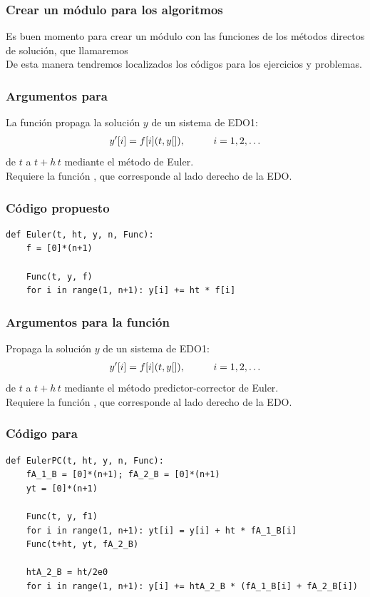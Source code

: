 \begin{frame}
\frametitle{Crear un módulo para los algoritmos}
Es buen momento para crear un módulo con las funciones de los métodos directos de solución, que llamaremos 
\\
\bigskip
De esta manera tendremos localizados los códigos para los ejercicios y problemas.
\end{frame}
\begin{frame}
\frametitle{Argumentos para }
La función propaga la solución $y$ de un sistema de EDO1:
\begin{align*}
{y}^{\prime}[i] =  f[i] (t, y[]), \hspace{1cm} i = 1, 2, \ldots
\end{align*}
de $t$ a $t + h \, t$ mediante el método de Euler.
\\
\bigskip
Requiere la función , que corresponde al lado derecho de la EDO.
\end{frame}
\begin{frame}[fragile]
\frametitle{Código propuesto }
\begin{lstlisting}[caption=Código para el método de Euler, style=codigopython]
def Euler(t, ht, y, n, Func):
    f = [0]*(n+1)
 
    Func(t, y, f)
    for i in range(1, n+1): y[i] += ht * f[i]
\end{lstlisting}
\end{frame}
\begin{frame}[fragile]
\frametitle{Argumentos para la función }
Propaga la solución $y$ de un sistema de EDO1:
\begin{align*}
{y}^{\prime}[i] =  f[i] (t, y[]), \hspace{1cm} i = 1, 2, \ldots
\end{align*}
de $t$ a $t + h \, t$ mediante el método predictor-corrector de Euler.
\\
\bigskip
Requiere la función , que corresponde al lado derecho de la EDO.
\end{frame}
\begin{frame}
\frametitle{Código para }
\begin{lstlisting}[caption=Código para el método predictor-corrector de Euler, style=codigopython]
def EulerPC(t, ht, y, n, Func):
    fA_1_B = [0]*(n+1); fA_2_B = [0]*(n+1)
    yt = [0]*(n+1)
 
    Func(t, y, f1)
    for i in range(1, n+1): yt[i] = y[i] + ht * fA_1_B[i]
    Func(t+ht, yt, fA_2_B)
 
    htA_2_B = ht/2e0
    for i in range(1, n+1): y[i] += htA_2_B * (fA_1_B[i] + fA_2_B[i]) 
\end{lstlisting}
\end{frame}
